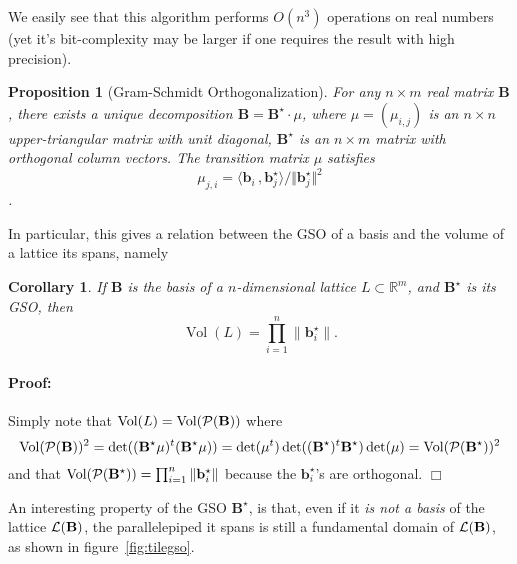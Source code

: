 \documentclass[12pt]{article}
\renewcommand{\vec}{\mathbf}
\newcommand{\R}{\mathbb R}
\newcommand{\norm}[1]{\|#1\|}
\newtheorem{proposition}[theorem]{Proposition}{\bfseries}{\upshape}
\newtheorem{corollary}[theorem]{Corollary}{\bfseries}{\upshape}
\newenvironment{proof}{\paragraph{Proof:} }{\hfill\qed\\}
\newcommand{\qed}{\hfill \ensuremath{\Box}}
\newcommand{\Vol}{\operatorname{Vol}}
\begin{document}
We easily see that this algorithm performs $O(n^3)$ operations on real numbers (yet it's bit-complexity may be larger if one requires the result with high precision).


\begin{proposition}[Gram-Schmidt Orthogonalization]
For any $n\times m$ real matrix $\vec B$, there exists a unique decomposition $\vec B =  \vec B^\star \cdot \mu$, 
where $\mu=(\mu_{i,j})$ is an $n\times n$ upper-triangular matrix with unit diagonal, $\vec B^\star$ is an $n\times m$ matrix with orthogonal column vectors.
The transition matrix $\mu$ satisfies
\[\mu_{j,i}= \langle \vec b_i\, , \vec b^\star_j \rangle / \Vert \vec b^\star_j \Vert^2 \].
\end{proposition}

In particular, this gives a relation between the GSO of a basis and the volume of a lattice its spans, namely

\begin{corollary}
If $\vec B$ is the basis of a $n$-dimensional lattice $L \subset \R^m$, and $\vec B^\star$ is its GSO,
then \[\Vol(L) = \prod_{i = 1}^n \norm{\vec b^\star_i}.\]
\end{corollary}
\begin{proof}
  Simply note that $\Vol(L) = \Vol(\cP(\vec B))$ where
  \[\Vol(\cP(\vec B))^2 = \det((\vec B^\star \mu)^t (\vec B^\star \mu) ) = \det(\mu^t) \det( (\vec B^\star)^t \vec B^\star) \det(\mu) = \Vol(\cP(\vec B^\star))^2 \]
  and that $ \Vol(\cP(\vec B^\star)) = \prod_{i = 1}^n \norm{\vec b^\star_i}$ because the $\vec b^\star_i$'s are orthogonal.
\end{proof}



An interesting property of the GSO $\vec B^\star$, is that, even if it {\em is not a basis} of the 
lattice $\cL(\vec B)$, the parallelepiped it spans is still a fundamental domain of $\cL(\vec B)$, as shown in figure~\ref{fig:tilegso}.
\end{document}
